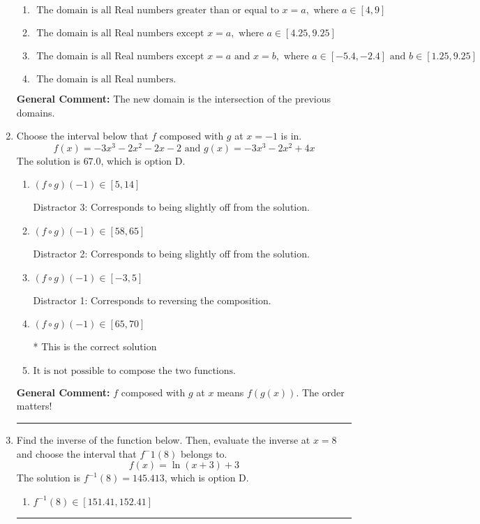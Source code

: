 \documentclass{extbook}[14pt]
\newcommand{\litem}[1]{\item #1

\rule{\textwidth}{0.4pt}}
\begin{document}
\begin{enumerate}
{\begin{enumerate}[label=\Alph*.]
\item \( \text{ The domain is all Real numbers greater than or equal to } x = a, \text{ where } a \in [4, 9] \)


\item \( \text{ The domain is all Real numbers except } x = a, \text{ where } a \in [4.25, 9.25] \)


\item \( \text{ The domain is all Real numbers except } x = a \text{ and } x = b, \text{ where } a \in [-5.4, -2.4] \text{ and } b \in [1.25, 9.25] \)


\item \( \text{ The domain is all Real numbers. } \)


\end{enumerate}

\textbf{General Comment:} The new domain is the intersection of the previous domains.
}
\litem{
Choose the interval below that $f$ composed with $g$ at $x=-1$ is in.
\[ f(x) = -3x^{3} -2 x^{2} -2 x -2 \text{ and } g(x) = -3x^{3} -2 x^{2} +4 x \]The solution is \( 67.0 \), which is option D.\begin{enumerate}[label=\Alph*.]
\item \( (f \circ g)(-1) \in [5, 14] \)

 Distractor 3: Corresponds to being slightly off from the solution.
\item \( (f \circ g)(-1) \in [58, 65] \)

 Distractor 2: Corresponds to being slightly off from the solution.
\item \( (f \circ g)(-1) \in [-3, 5] \)

 Distractor 1: Corresponds to reversing the composition.
\item \( (f \circ g)(-1) \in [65, 70] \)

* This is the correct solution
\item \( \text{It is not possible to compose the two functions.} \)


\end{enumerate}

\textbf{General Comment:} $f$ composed with $g$ at $x$ means $f(g(x))$. The order matters!
}
\litem{
Find the inverse of the function below. Then, evaluate the inverse at $x = 8$ and choose the interval that $f^-1(8)$ belongs to.
\[ f(x) = \ln{(x+3)}+3 \]The solution is \( f^{-1}(8) = 145.413 \), which is option D.\begin{enumerate}[label=\Alph*.]
\item \( f^{-1}(8) \in [151.41, 152.41] \)


\end{enumerate}}
\end{enumerate}
\end{document}
